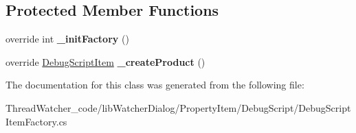 \subsection*{Protected Member Functions}
\begin{DoxyCompactItemize}
\item 
\hypertarget{classlib_watcher_dialog_1_1_property_item_1_1_debug_script_1_1_debug_script_item_factory_a7304c1ceab1d5eacbd063621d109294d}{override int {\bfseries \+\_\+init\+Factory} ()}\label{classlib_watcher_dialog_1_1_property_item_1_1_debug_script_1_1_debug_script_item_factory_a7304c1ceab1d5eacbd063621d109294d}

\item 
\hypertarget{classlib_watcher_dialog_1_1_property_item_1_1_debug_script_1_1_debug_script_item_factory_a1252fb9f744f5390a0d6a2b5240cf283}{override \hyperlink{classlib_watcher_dialog_1_1_property_item_1_1_debug_script_1_1_debug_script_item}{Debug\+Script\+Item} {\bfseries \+\_\+create\+Product} ()}\label{classlib_watcher_dialog_1_1_property_item_1_1_debug_script_1_1_debug_script_item_factory_a1252fb9f744f5390a0d6a2b5240cf283}

\end{DoxyCompactItemize}


The documentation for this class was generated from the following file\+:\begin{DoxyCompactItemize}
\item 
Thread\+Watcher\+\_\+code/lib\+Watcher\+Dialog/\+Property\+Item/\+Debug\+Script/Debug\+Script\+Item\+Factory.\+cs\end{DoxyCompactItemize}
